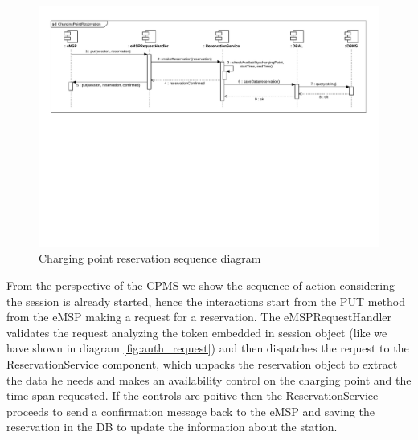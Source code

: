 \begin{figure}
    \centering
    \includegraphics[trim={0 10cm 0 0},clip, width=1\textwidth]{Images/cp2/runtime/Booking_cpms_view.pdf}
    \caption{Charging point reservation sequence diagram}
\end{figure}
From the perspective of the CPMS we show the sequence of action considering the session is already started, hence the interactions start from the PUT method from the eMSP making a request for a reservation. The eMSPRequestHandler validates the request analyzing the token embedded in session object (like we have shown in diagram \ref{fig:auth_request}) and then dispatches the request to the ReservationService component, which unpacks the reservation object to extract the data he needs and makes an availability control on the charging point and the time span requested. If the controls are poitive then the ReservationService proceeds to send a confirmation message back to the eMSP and saving the reservation in the DB to update the information about the station.

